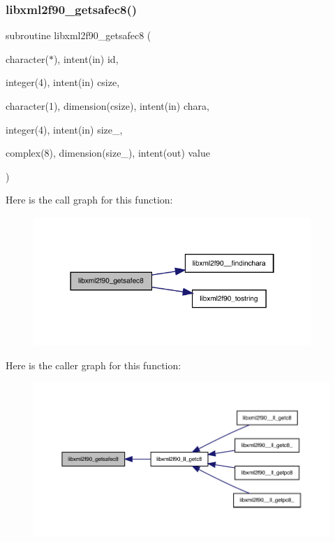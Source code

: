 \subsubsection{\texorpdfstring{libxml2f90\+\_\+getsafec8()}{libxml2f90\_getsafec8()}}
{\footnotesize\ttfamily subroutine libxml2f90\+\_\+getsafec8 (\begin{DoxyParamCaption}\item[{character($\ast$), intent(in)}]{id,  }\item[{integer(4), intent(in)}]{csize,  }\item[{character(1), dimension(csize), intent(in)}]{chara,  }\item[{integer(4), intent(in)}]{size\+\_\+,  }\item[{complex(8), dimension(size\+\_\+), intent(out)}]{value }\end{DoxyParamCaption})}

Here is the call graph for this function\+:
\nopagebreak
\begin{figure}[H]
\begin{center}
\leavevmode
\includegraphics[width=298pt]{libxml2f90_8f90__pp_8f90_a9ba5ab680800c28b4f9d6ceb0e8aa3f4_cgraph}
\end{center}
\end{figure}
Here is the caller graph for this function\+:
\nopagebreak
\begin{figure}[H]
\begin{center}
\leavevmode
\includegraphics[width=350pt]{libxml2f90_8f90__pp_8f90_a9ba5ab680800c28b4f9d6ceb0e8aa3f4_icgraph}
\end{center}
\end{figure}
\mbox{\label{libxml2f90_8f90__pp_8f90_ac813de3235a2af4f169c5434743f86a2}} 
